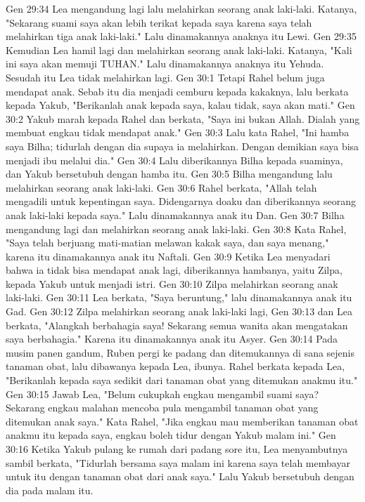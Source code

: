 Gen 29:34  Lea mengandung lagi lalu melahirkan seorang anak laki-laki. Katanya, "Sekarang suami saya akan lebih terikat kepada saya karena saya telah melahirkan tiga anak laki-laki." Lalu dinamakannya anaknya itu Lewi.
Gen 29:35  Kemudian Lea hamil lagi dan melahirkan seorang anak laki-laki. Katanya, "Kali ini saya akan memuji TUHAN." Lalu dinamakannya anaknya itu Yehuda. Sesudah itu Lea tidak melahirkan lagi.
Gen 30:1  Tetapi Rahel belum juga mendapat anak. Sebab itu dia menjadi cemburu kepada kakaknya, lalu berkata kepada Yakub, "Berikanlah anak kepada saya, kalau tidak, saya akan mati."
Gen 30:2  Yakub marah kepada Rahel dan berkata, "Saya ini bukan Allah. Dialah yang membuat engkau tidak mendapat anak."
Gen 30:3  Lalu kata Rahel, "Ini hamba saya Bilha; tidurlah dengan dia supaya ia melahirkan. Dengan demikian saya bisa menjadi ibu melalui dia."
Gen 30:4  Lalu diberikannya Bilha kepada suaminya, dan Yakub bersetubuh dengan hamba itu.
Gen 30:5  Bilha mengandung lalu melahirkan seorang anak laki-laki.
Gen 30:6  Rahel berkata, "Allah telah mengadili untuk kepentingan saya. Didengarnya doaku dan diberikannya seorang anak laki-laki kepada saya." Lalu dinamakannya anak itu Dan.
Gen 30:7  Bilha mengandung lagi dan melahirkan seorang anak laki-laki.
Gen 30:8  Kata Rahel, "Saya telah berjuang mati-matian melawan kakak saya, dan saya menang," karena itu dinamakannya anak itu Naftali.
Gen 30:9  Ketika Lea menyadari bahwa ia tidak bisa mendapat anak lagi, diberikannya hambanya, yaitu Zilpa, kepada Yakub untuk menjadi istri.
Gen 30:10  Zilpa melahirkan seorang anak laki-laki.
Gen 30:11  Lea berkata, "Saya beruntung," lalu dinamakannya anak itu Gad.
Gen 30:12  Zilpa melahirkan seorang anak laki-laki lagi,
Gen 30:13  dan Lea berkata, "Alangkah berbahagia saya! Sekarang semua wanita akan mengatakan saya berbahagia." Karena itu dinamakannya anak itu Asyer.
Gen 30:14  Pada musim panen gandum, Ruben pergi ke padang dan ditemukannya di sana sejenis tanaman obat, lalu dibawanya kepada Lea, ibunya. Rahel berkata kepada Lea, "Berikanlah kepada saya sedikit dari tanaman obat yang ditemukan anakmu itu."
Gen 30:15  Jawab Lea, "Belum cukupkah engkau mengambil suami saya? Sekarang engkau malahan mencoba pula mengambil tanaman obat yang ditemukan anak saya." Kata Rahel, "Jika engkau mau memberikan tanaman obat anakmu itu kepada saya, engkau boleh tidur dengan Yakub malam ini."
Gen 30:16  Ketika Yakub pulang ke rumah dari padang sore itu, Lea menyambutnya sambil berkata, "Tidurlah bersama saya malam ini karena saya telah membayar untuk itu dengan tanaman obat dari anak saya." Lalu Yakub bersetubuh dengan dia pada malam itu.
